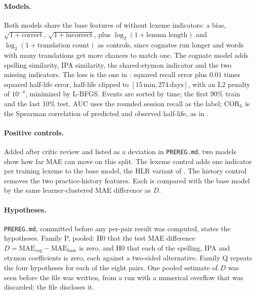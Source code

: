 \documentclass[11pt]{article}
\begin{document}
\paragraph{Models.} Both models share the base features of
\autocite{settles2016hlr} without lexeme indicators: a bias,
$\sqrt{1+\text{correct}}$, $\sqrt{1+\text{incorrect}}$, plus
$\log_2(1+\text{lemma length})$ and $\log_2(1+\text{translation count})$
as controls, since cognates run longer and words with many translations
get more chances to match one. The cognate model adds spelling similarity, IPA similarity,
the shared-etymon indicator and the two missing indicators. The loss is
the one in \autocite{settles2016hlr}: squared recall error plus $0.01$
times squared half-life error, half-life clipped to
$[15\,\text{min}, 274\,\text{days}]$, with an L2 penalty of $10^{-4}$,
minimized by L-BFGS. Events are sorted by time; the first 90\% train and
the last 10\% test. AUC uses the rounded session recall as the label;
COR$_h$ is the Spearman correlation of predicted and observed half-life,
as in \autocite{settles2016hlr}.

\paragraph{Positive controls.} Added after critic review and listed as a
deviation in \texttt{PREREG.md}, two models show how far MAE can move on
this split. The lexeme control adds one indicator per training lexeme to
the base model, the HLR variant of \autocite{settles2016hlr}. The history
control removes the two practice-history features. Each is compared with
the base model by the same learner-clustered MAE difference as $D$.

\paragraph{Hypotheses.} \texttt{PREREG.md}, committed before any
per-pair result was computed, states the hypotheses. Family P, pooled:
H0 that the test MAE difference $D = \mathrm{MAE}_{\text{cog}} -
\mathrm{MAE}_{\text{base}}$ is zero, and H0 that each of the spelling,
IPA and etymon coefficients is zero, each against a two-sided
alternative. Family Q repeats the four hypotheses for each of the eight
pairs. One pooled estimate of $D$ was seen before the file was written,
from a run with a numerical overflow that was discarded; the file
discloses it.
\end{document}
